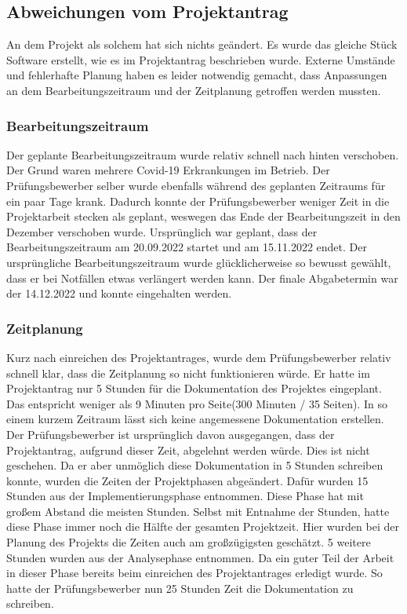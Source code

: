 \subsection{Abweichungen vom Projektantrag}
\label{sec:AbweichungenProjektantrag}

An dem Projekt als solchem hat sich nichts geändert. Es wurde das gleiche Stück Software erstellt, wie es im Projektantrag beschrieben wurde. Externe Umstände und fehlerhafte Planung haben es leider notwendig gemacht, dass Anpassungen an dem Bearbeitungszeitraum und der Zeitplanung getroffen werden mussten.

\subsubsection{Bearbeitungszeitraum}
\label{sec:AbweichungenProjektantrag}
Der geplante Bearbeitungszeitraum wurde relativ schnell nach hinten verschoben. Der Grund waren mehrere Covid-19 Erkrankungen im Betrieb. Der Prüfungsbewerber selber wurde ebenfalls während des geplanten Zeitraums für ein paar Tage krank. Dadurch konnte der Prüfungsbewerber weniger Zeit in die Projektarbeit stecken als geplant, weswegen das Ende der Bearbeitungszeit in den Dezember verschoben wurde. Ursprünglich war geplant, dass der Bearbeitungszeitraum am 20.09.2022 startet und am 15.11.2022 endet. Der ursprüngliche Bearbeitungszeitraum wurde glücklicherweise so bewusst gewählt, dass er bei Notfällen etwas verlängert werden kann. Der finale Abgabetermin war der 14.12.2022 und konnte eingehalten werden.

\subsubsection{Zeitplanung}
\label{sec:AbweichungenProjektantrag}

Kurz nach einreichen des Projektantrages, wurde dem Prüfungsbewerber relativ schnell klar, dass die Zeitplanung so nicht funktionieren würde. Er hatte im Projektantrag nur 5 Stunden für die Dokumentation des Projektes eingeplant. Das entspricht weniger als 9 Minuten pro Seite(300 Minuten / 35 Seiten). In so einem kurzem Zeitraum lässt sich keine angemessene Dokumentation erstellen. Der Prüfungsbewerber ist ursprünglich davon ausgegangen, dass der Projektantrag, aufgrund dieser Zeit, abgelehnt werden würde. Dies ist nicht geschehen. Da er aber unmöglich diese Dokumentation in 5 Stunden schreiben konnte, wurden die Zeiten der Projektphasen abgeändert. Dafür wurden 15 Stunden aus der Implementierungsphase entnommen. Diese Phase hat mit großem Abstand die meisten Stunden. Selbst mit Entnahme der Stunden, hatte diese Phase immer noch die Hälfte der gesamten Projektzeit. Hier wurden bei der Planung des Projekts die Zeiten auch am großzügigsten geschätzt. 5 weitere Stunden wurden aus der Analysephase entnommen. Da ein guter Teil der Arbeit in dieser Phase bereits beim einreichen des Projektantrages erledigt wurde. So hatte der Prüfungsbewerber nun 25 Stunden Zeit die Dokumentation zu schreiben.

